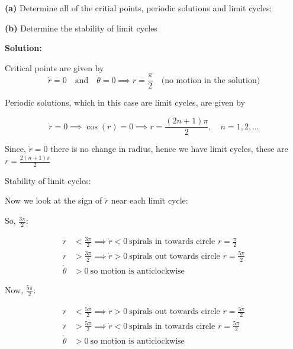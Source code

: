\documentclass[10pt,landscape]{article}
\begin{document}
\begin{multicols}{2}
\textbf{(a)} Determine all of the critial points, periodic solutions and limit cycles:

\textbf{(b)} Determine the stability of limit cycles

\textbf{Solution:}

Critical points are given by \\

$$\dot{r} = 0 \quad \text{and} \quad \dot{\theta} = 0 \implies r = \frac{\pi}{2} \quad \text{(no motion in the solution)}$$

Periodic solutions, which in this case are limit cycles, are given by 

$$\dot{r} = 0 \implies \cos(r) = 0 \implies r =\frac{(2n+1)\pi}{2}, \quad n = 1, 2, \dots$$

Since, $\dot{r}= 0$ there is no change in radius, hence we have limit cycles, these are $r = \frac{2(n+1)\pi}{2}$

Stability of limit cycles:




Now we look at the sign of $\dot{r}$ near each limit cycle:

So, $\frac{3\pi}{2}:$ 

\begin{align*}
    r&<\frac{3\pi}{2} \implies \dot{r} 
< 0 \ \text{spirals in towards circle $r = \frac{\pi}{2}$} \\
r&>\frac{3\pi}{2} \implies \dot{r}
> 0  \ \text{spirals out towards circle $r = \frac{5\pi}{2}$}\\
\dot{\theta}&>0 \ \text{so motion is anticlockwise}
\end{align*}



Now, $\frac{5\pi}{2}:$ 

\begin{align*}
    r&<\frac{5\pi}{2} \implies \dot{r}
> 0 \ \text{spirals out towards circle $r = \frac{5\pi}{2}$}\\
r&>\frac{5\pi}{2} \implies \dot{r}
< 0 \ \text{spirals in towards circle $r = \frac{5\pi}{2}$} \\
\dot{\theta}&>0 \ \text{so motion is anticlockwise}
\end{align*}\\


\end{multicols}
\end{document}
